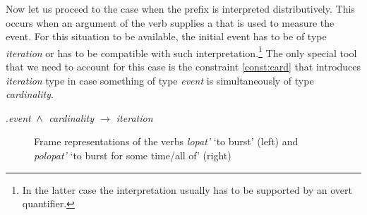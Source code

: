 Now let us proceed to the case when the prefix  is interpreted distributively. This occurs when an argument of the verb supplies a  that is used to measure the event. For this situation to be available, the initial event has to be of type \textit{iteration} or has to be compatible with such interpretation.\footnote{In the latter case the  interpretation usually has to be supported by an overt quantifier.} The only special tool that we need to account for this case is the constraint \ref{const:card} that introduces \textit{iteration} type in case something of type \textit{event} is simultaneously of type \textit{cardinality}. 

\ex.\label{const:card}\textit{event $\,\wedge\,$ cardinality $\rightarrow$ iteration}

 
 \begin{figure}
\hfill{}
\hfill%
\hfill%
\caption{Frame representations of the verbs \textit{lopat'} `to burst' (left) and \textit{polopat'} `to burst for some time/all of' (right) \label{frame:lopat}}
\end{figure}
 
